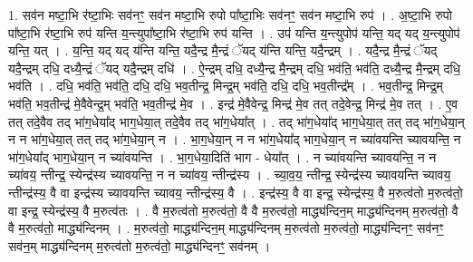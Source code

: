 \documentclass[17pt]{extarticle}
\begin{document}
1. सव॑न मष्टा॒भि र॑ष्टा॒भिः सव॑नꣳ॒॒ सव॑न मष्टा॒भि रुपो पा᳚ष्टा॒भिः सव॑नꣳ॒॒ सव॑न मष्टा॒भि रुप॑ । . अ॒ष्टा॒भि रुपो पा᳚ष्टा॒भि र॑ष्टा॒भि रुप॑ यन्ति य॒न्त्युपा᳚ष्टा॒भि र॑ष्टा॒भि रुप॑ यन्ति । . उप॑ यन्ति य॒न्त्युपोप॑ यन्ति॒ यद् यद् य॒न्त्युपोप॑ यन्ति॒ यत् । . य॒न्ति॒ यद् यद् य॑न्ति यन्ति॒ यदै॒न्द्र मै॒न्द्रं ॅयद् य॑न्ति यन्ति॒ यदै॒न्द्रम् । . यदै॒न्द्र मै॒न्द्रं ॅयद् यदै॒न्द्रम् दधि॒ दध्यै॒न्द्रं ॅयद् यदै॒न्द्रम् दधि॑ । . ऐ॒न्द्रम् दधि॒ दध्यै॒न्द्र मै॒न्द्रम् दधि॒ भव॑ति॒ भव॑ति॒ दध्यै॒न्द्र मै॒न्द्रम् दधि॒ भव॑ति । . दधि॒ भव॑ति॒ भव॑ति॒ दधि॒ दधि॒ भव॒तीन्द्र॒ मिन्द्र॒म् भव॑ति॒ दधि॒ दधि॒ भव॒तीन्द्र᳚म् । . भव॒तीन्द्र॒ मिन्द्र॒म् भव॑ति॒ भव॒तीन्द्र॑ मे॒वैवेन्द्र॒म् भव॑ति॒ भव॒तीन्द्र॑ मे॒व । . इन्द्र॑ मे॒वैवेन्द्र॒ मिन्द्र॑ मे॒व तत् तदे॒वेन्द्र॒ मिन्द्र॑ मे॒व तत् । . ए॒व तत् तदे॒वैव तद् भा॑ग॒धेया᳚द् भाग॒धेया॒त् तदे॒वैव तद् भा॑ग॒धेया᳚त् । . तद् भा॑ग॒धेया᳚द् भाग॒धेया॒त् तत् तद् भा॑ग॒धेया॒न् न न भा॑ग॒धेया॒त् तत् तद् भा॑ग॒धेया॒न् न । . भा॒ग॒धेया॒न् न न भा॑ग॒धेया᳚द् भाग॒धेया॒न् न च्या॑वयन्ति च्यावयन्ति॒ न भा॑ग॒धेया᳚द् भाग॒धेया॒न् न च्या॑वयन्ति । . भा॒ग॒धेया॒दिति॑ भाग - धेया᳚त् । . न च्या॑वयन्ति च्यावयन्ति॒ न न च्या॑वय॒ न्तीन्द्र॒ स्येन्द्र॑स्य च्यावयन्ति॒ न न च्या॑वय॒ न्तीन्द्र॑स्य । . च्या॒व॒य॒ न्तीन्द्र॒ स्येन्द्र॑स्य च्यावयन्ति च्यावय॒ न्तीन्द्र॑स्य॒ वै वा इन्द्र॑स्य च्यावयन्ति च्यावय॒ न्तीन्द्र॑स्य॒ वै । . इन्द्र॑स्य॒ वै वा इन्द्र॒ स्येन्द्र॑स्य॒ वै म॒रुत्व॑तो म॒रुत्व॑तो॒ वा इन्द्र॒ स्येन्द्र॑स्य॒ वै म॒रुत्व॑तः । . वै म॒रुत्व॑तो म॒रुत्व॑तो॒ वै वै म॒रुत्व॑तो॒ माद्ध्य॑न्दिन॒म् माद्ध्य॑न्दिनम् म॒रुत्व॑तो॒ वै वै म॒रुत्व॑तो॒ माद्ध्य॑न्दिनम् । . म॒रुत्व॑तो॒ माद्ध्य॑न्दिन॒म् माद्ध्य॑न्दिनम् म॒रुत्व॑तो म॒रुत्व॑तो॒ माद्ध्य॑न्दिनꣳ॒॒ सव॑नꣳ॒॒ सव॑न॒म् माद्ध्य॑न्दिनम् म॒रुत्व॑तो म॒रुत्व॑तो॒ माद्ध्य॑न्दिनꣳ॒॒ सव॑नम् । \newline
\end{document}
